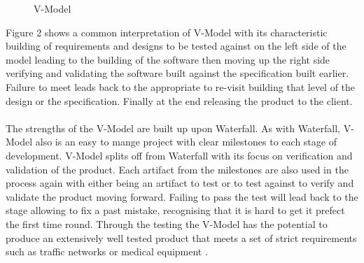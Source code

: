 \documentclass{style/CRPITStyle}
\renewcommand{\cite}{\citep}
\begin{document}
\vspace{.1in}

\begin{figure}[htb]
\caption{\protect\label{vmodel}  V-Model}
\end{figure}

\vspace{.1in}

Figure 2 shows a common interpretation of V-Model with its characteristic
building of requirements and designs to be tested against on the left side of
the model leading to the building of the software then moving up the right side
verifying and validating the software built against the specification built
earlier. Failure to meet leads back to the appropriate to re-visit building that
level of the design or the specification. Finally at the end releasing the
product to the client.

\paragraph{}

The strengths of the V-Model are built up upon Waterfall.
As with Waterfall, V-Model also is an easy to mange project with clear milestones
to each stage of development.
V-Model splits off from Waterfall with its focus
on verification and validation of the product.
Each artifact from the milestones are also used in the process again with either
being an artifact to test or to test against to verify and validate the product
moving forward. Failing to pass the test will lead back to the stage allowing to
fix a past mistake, recognising that it is hard to get it prefect the first time
round.
Through the testing the V-Model has the potential to produce an extensively well
tested product that meets a set of strict requirements such as traffic networks
or medical equipment \cite{advancements:2010:vmodel}.

\paragraph{}
\end{document}
